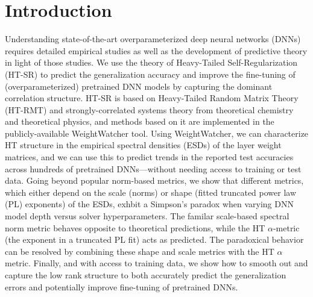 \documentclass{article}
\begin{document}


\section*{Introduction}

Understanding state-of-the-art overparameterized deep neural networks (DNNs) requires detailed empirical studies as well as the development of predictive theory in light of those studies. 
We use the theory of Heavy-Tailed Self-Regularization (HT-SR) to predict the generalization accuracy and improve the fine-tuning of (overparameterized) pretrained DNN models by capturing the dominant correlation structure.
HT-SR is based on Heavy-Tailed Random Matrix Theory (HT-RMT) and strongly-correlated systems theory from theoretical chemistry and theoretical physics, and methods based on it are implemented in the publicly-available WeightWatcher tool.
Using WeightWatcher, we can characterize HT structure in the empirical spectral densities (ESDs) of the layer weight matrices, and we can use this to predict trends in the reported test accuracies across hundreds of pretrained DNNs---without needing access to training or test data.
Going beyond popular norm-based metrics, we show that different metrics, which either depend on the scale (norms) or shape (fitted truncated power law (PL) exponents) of the ESDs, exhbit a Simpson's paradox when varying DNN model depth versus solver hyperparameters.
The familar scale-based spectral norm metric behaves opposite to theoretical predictions, while the HT $\alpha$-metric (the exponent in a truncated PL fit) acts as predicted.
The paradoxical behavior  can be resolved by combining these shape and scale metrics with the HT $\hat{\alpha}$ metric.
Finally, and with access to training data, we show how to
smooth out and capture the low rank structure to both accurately
predict the generalization errors and potentially improve
fine-tuning of pretrained DNNs.
\end{document}
